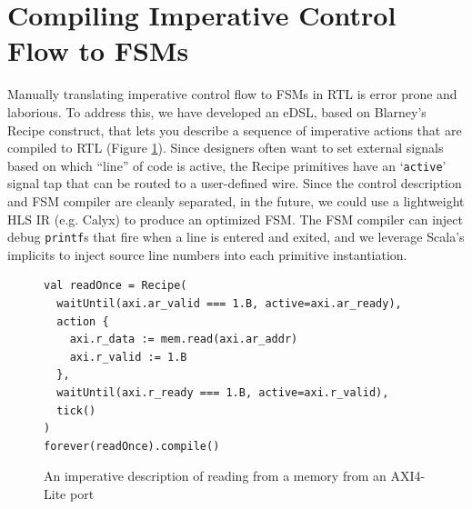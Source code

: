\documentclass[sigplan,review,nonacm,9pt]{acmart}
\begin{document}
%
%

\section{Compiling Imperative Control Flow to FSMs}

Manually translating imperative control flow to FSMs in RTL is error prone and laborious.
To address this, we have developed an eDSL\cite{chisel_recipes}, based on Blarney's Recipe construct\cite{blarney}, that lets you describe a sequence of imperative actions that are compiled to RTL (Figure \ref{fig:recipes}).
Since designers often want to set external signals based on which ``line'' of code is active, the Recipe primitives have an `\texttt{active}' signal tap that can be routed to a user-defined wire.
Since the control description and FSM compiler are cleanly separated, in the future, we could use a lightweight HLS IR (e.g. Calyx\cite{calyx}) to produce an optimized FSM.
The FSM compiler can inject debug \texttt{printf}s that fire when a line is entered and exited, and we leverage Scala's implicits\cite{sourcecode} to inject source line numbers into each primitive instantiation.

\begin{figure}
\begin{verbatim}
val readOnce = Recipe(
  waitUntil(axi.ar_valid === 1.B, active=axi.ar_ready),
  action {
    axi.r_data := mem.read(axi.ar_addr)
    axi.r_valid := 1.B
  },
  waitUntil(axi.r_ready === 1.B, active=axi.r_valid),
  tick()
)
forever(readOnce).compile()
\end{verbatim}
\caption{An imperative description of reading from a memory from an AXI4-Lite port}
\label{fig:recipes}
\end{figure}
\end{document}
